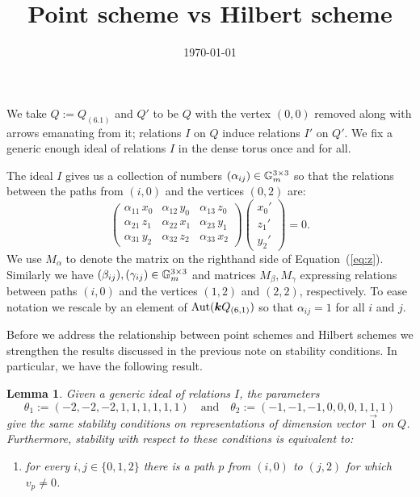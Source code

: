 \documentclass{amsart}
\title{Point scheme vs Hilbert scheme}
\date{\today}
\newtheorem{lem}[thm]{Lemma}
\theoremstyle{definition}
\begin{document}
\maketitle

We take $Q:= Q_{(6.1)}$ and $Q'$ to be $Q$ with the vertex $(0,0)$ removed along with arrows emanating from it; relations $I$ on $Q$ induce relations $I'$ on $Q'$.
We fix a generic enough ideal of relations $I$ in the dense torus once and for all.

The ideal $I$ gives us a collection of numbers $(\alpha_{ij}) \in \mathbb{G}_m^{3 \times 3}$ so that the relations between the paths from $(i,0)$ and the vertices $(0,2)$ are:
\begin{equation}\label{eq:z}
    \begin{pmatrix}
    \alpha_{11}\, x_0 & \alpha_{12}\, y_0 & \alpha_{13}\, z_0 \\
    \alpha_{21}\, z_1 & \alpha_{22}\, x_1 & \alpha_{23}\, y_1 \\
    \alpha_{31}\, y_2 & \alpha_{32}\, z_2 & \alpha_{33}\, x_2
\end{pmatrix} \begin{pmatrix}
    x_0' \\ z_1' \\ y_2'
\end{pmatrix} =0.
\end{equation}
We use $M_\alpha$ to denote the matrix on the righthand side of Equation~(\ref{eq:z}).
Similarly we have $(\beta_{ij}), (\gamma_{ij}) \in \mathbb{G}_m^{3 \times 3}$ and matrices $M_\beta, M_\gamma$ expressing relations between paths $(i,0)$ and the vertices $(1,2)$ and $(2,2)$, respectively.
To ease notation we rescale by an element of $\text{Aut}({\boldsymbol{k}} Q_{(6,1)})$ so that $\alpha_{ij}=1$ for all $i$ and $j$.

Before we address the relationship between point schemes and Hilbert schemes we strengthen the results discussed in the previous note on stability conditions.
In particular, we have the following result.

\begin{lem}
Given a generic ideal of relations $I$, the parameters $$\theta_1:= (-2,-2,-2,1,1,1,1,1,1) \quad \text{and} \quad \theta_2:= (-1,-1,-1,0,0,0,1,1,1)$$ give the same stability conditions on representations of dimension vector $\vec{1}$ on $Q$.
Furthermore, stability with respect to these conditions is equivalent to:
\begin{enumerate}
    \item[(2)] for every $i,j \in \{0,1,2\}$ there is a path $p$ from $(i,0)$ to $(j,2)$ for which $v_p\neq 0$.
\end{enumerate}
\end{lem}
\end{document}
